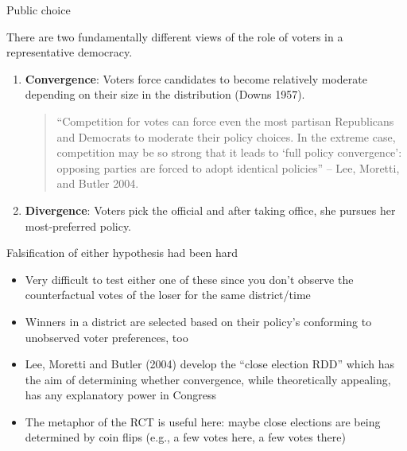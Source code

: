\documentclass{beamer}
\begin{document}
\begin{frame}{Public choice}

There are two fundamentally different views of the role of voters in a representative democracy.
		\begin{enumerate}
		\item \textbf{Convergence}: Voters force candidates to become relatively moderate depending on their size in the distribution (Downs 1957).  \begin{quote}``Competition for votes can force even the most partisan Republicans and Democrats to moderate their policy choices. In the extreme case, competition may be so strong that it leads to `full policy convergence': opposing parties are forced to adopt identical policies'' -- Lee, Moretti, and Butler 2004.\end{quote}
		\item \textbf{Divergence}: Voters pick the official and after taking office, she pursues her most-preferred policy.  
		\end{enumerate}

\end{frame}


\begin{frame}{Falsification of either hypothesis had been hard}

\begin{itemize}
\item Very difficult to test either one of these since you don't observe the counterfactual votes of the loser for the same district/time
\item Winners in a district are selected based on their policy's conforming to unobserved voter preferences, too
\item Lee, Moretti and Butler (2004) develop the ``close election RDD'' which has the aim of determining whether convergence, while theoretically appealing, has any explanatory power in Congress
\item The metaphor of the RCT is useful here: maybe close elections are being determined by coin flips (e.g., a few votes here, a few votes there)
\end{itemize}

\end{frame}
\end{document}
